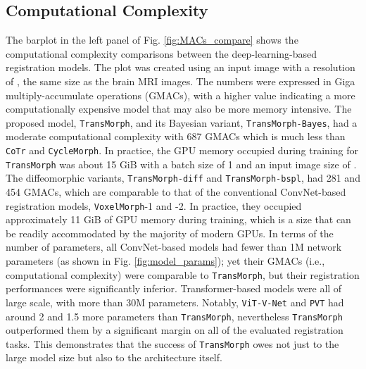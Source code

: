 \documentclass[times,twocolumn,final]{elsarticle}
\begin{document}
\subsection{Computational Complexity}
The barplot in the left panel of Fig. \ref{fig:MACs_compare} shows the computational complexity comparisons between the deep-learning-based registration models. The plot was created using an input image with a resolution of , the same size as the brain MRI images. The numbers were expressed in Giga multiply-accumulate operations (GMACs), with a higher value indicating a more computationally expensive model that may also be more memory intensive. The proposed model, \texttt{TransMorph}, and its Bayesian variant, \texttt{TransMorph-Bayes}, had a moderate computational complexity with 687 GMACs which is much less than \texttt{CoTr} and \texttt{CycleMorph}. In practice, the GPU memory occupied during training for \texttt{TransMorph} was about 15 GiB with a batch size of 1 and an input image size of . The diffeomorphic variants, \texttt{TransMorph-diff} and \texttt{TransMorph-bspl}, had 281 and 454 GMACs, which are comparable to that of the conventional ConvNet-based registration models, \texttt{VoxelMorph}-1 and -2. In practice, they occupied approximately 11 GiB of GPU memory during training, which is a size that can be readily accommodated by the majority of modern GPUs. In terms of the number of parameters, all ConvNet-based models had fewer than 1M network parameters (as shown in Fig. \ref{fig:model_params}); yet their GMACs (i.e., computational complexity) were comparable to \texttt{TransMorph}, but their registration performances were significantly inferior. Transformer-based models were all of large scale, with more than 30M parameters. Notably, \texttt{ViT-V-Net} and \texttt{PVT} had around 2 and 1.5 more parameters than \texttt{TransMorph}, nevertheless \texttt{TransMorph} outperformed them by a significant margin on all of the evaluated registration tasks. This demonstrates that the success of \texttt{TransMorph} owes not just to the large model size but also to the architecture itself.
\end{document}
